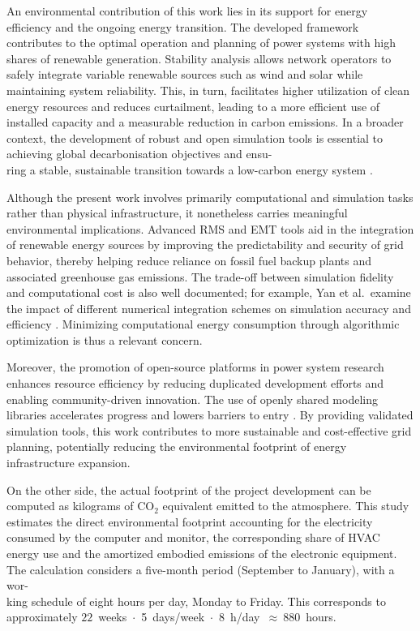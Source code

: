 An environmental contribution of this work lies in its support for energy efficiency and the 
ongoing energy transition. The developed framework contributes to the optimal operation and planning
of power systems with high shares of renewable generation. Stability analysis allows network operators to 
safely integrate variable renewable sources such as wind and solar while maintaining system reliability. 
This, in turn, facilitates higher utilization of clean energy resources and reduces curtailment, 
leading to a more efficient use of installed capacity and a measurable reduction in carbon emissions. 
In a broader context, the development of robust and open simulation tools is essential to achieving global 
decarbonisation objectives and ensu-\\ring a stable, sustainable transition towards a low-carbon energy system \cite{IEA2024Transition}.

Although the present work involves primarily computational and simulation tasks rather than physical infrastructure,
it nonetheless carries meaningful environmental implications. 
Advanced RMS and EMT tools aid in the integration of 
renewable energy sources by improving the predictability and security of grid behavior, thereby helping reduce
reliance on fossil fuel backup plants and associated greenhouse gas emissions\cite{XiongParaETM2024}. 
The trade-off between simulation fidelity and computational cost is also well documented; for example, Yan et al.\ examine
the impact of different numerical integration schemes on simulation accuracy and efficiency \cite{YanCompEff2025}. 
Minimizing computational energy consumption through algorithmic optimization is thus a relevant concern.

Moreover, the promotion of open-source platforms in power system research enhances resource efficiency by reducing 
duplicated development efforts and enabling community-driven innovation. The use of openly shared modeling libraries 
accelerates progress and lowers barriers to entry \cite{TesfatsionOpenSource}. By providing validated simulation tools, 
this work contributes to more sustainable and cost-effective grid planning, potentially reducing the environmental 
footprint of energy infrastructure expansion.

On the other side, the actual footprint of the project development can be computed as kilograms of CO$_2$ equivalent emitted
to the atmosphere. This study estimates the direct environmental footprint accounting for the
electricity consumed by the computer and monitor, the corresponding share of HVAC energy use and the amortized embodied 
emissions of the electronic equipment. 
The calculation considers a five-month period (September to January), with a wor-\\king schedule of eight hours per day, Monday to Friday. 
This corresponds to approximately $22$~weeks~$ \cdot $~5~days/week~$ \cdot $~8~h/day~$\approx~880$~hours.

